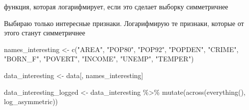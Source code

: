 \documentclass[
]{article}
\newenvironment{Shaded}{\begin{snugshade}}{\end{snugshade}}
\newcommand{\ControlFlowTok}[1]{\textcolor[rgb]{0.13,0.29,0.53}{\textbf{#1}}}
\newcommand{\DecValTok}[1]{\textcolor[rgb]{0.00,0.00,0.81}{#1}}
\newcommand{\FunctionTok}[1]{\textcolor[rgb]{0.00,0.00,0.00}{#1}}
\newcommand{\NormalTok}[1]{#1}
\newcommand{\OtherTok}[1]{\textcolor[rgb]{0.56,0.35,0.01}{#1}}
\newcommand{\SpecialCharTok}[1]{\textcolor[rgb]{0.00,0.00,0.00}{#1}}
\newcommand{\StringTok}[1]{\textcolor[rgb]{0.31,0.60,0.02}{#1}}
\begin{document}
функция, которая логарифмирует, если это сделает выборку симметричнее

\begin{Shaded}
\end{Shaded}

Выбираю только интересные признаки. Логарифмирую те признаки, которые от
этого станут симметричнее

\begin{Shaded}
\begin{Highlighting}[]
\NormalTok{names\_interesting }\OtherTok{\textless{}{-}} \FunctionTok{c}\NormalTok{(}\StringTok{"AREA"}\NormalTok{, }\StringTok{"POP80"}\NormalTok{, }\StringTok{"POP92"}\NormalTok{, }\StringTok{"POPDEN"}\NormalTok{, }\StringTok{"CRIME"}\NormalTok{, }\StringTok{"BORN\_F"}\NormalTok{, }\StringTok{"POVERT"}\NormalTok{, }\StringTok{"INCOME"}\NormalTok{, }\StringTok{"UNEMP"}\NormalTok{, }\StringTok{"TEMPER"}\NormalTok{)}

\NormalTok{data\_interesting }\OtherTok{\textless{}{-}}\NormalTok{ data[, names\_interesting]}

\NormalTok{data\_interesting\_logged }\OtherTok{\textless{}{-}}\NormalTok{ data\_interesting }\SpecialCharTok{\%\textgreater{}\%}
    \FunctionTok{mutate}\NormalTok{(}\FunctionTok{across}\NormalTok{(}\FunctionTok{everything}\NormalTok{(), log\_asymmetric))}
\end{Highlighting}
\end{Shaded}
\end{document}
